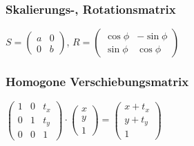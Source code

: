 \documentclass{article}
\begin{document}
\subsubsection*{Skalierungs-, Rotationsmatrix}
\begin{center}
	$S = \begin{pmatrix}
		a & 0\\
		0 & b
	\end{pmatrix}$,
	$R = \begin{pmatrix}
		\cos\phi & -\sin\phi\\
		\sin\phi & \cos\phi
	  \end{pmatrix}$
\end{center}

\subsubsection*{Homogone Verschiebungsmatrix}
\begin{center}
	$
        \begin{pmatrix}
          1 & 0 & t_x\\
          0 & 1 & t_y\\
          0 & 0 & 1
        \end{pmatrix}
        \cdot \begin{pmatrix}
          x\\y\\1
        \end{pmatrix}
        = \begin{pmatrix}
          x + t_x\\
          y + t_y\\
          1
        \end{pmatrix}
        $
\end{center}
\end{document}
